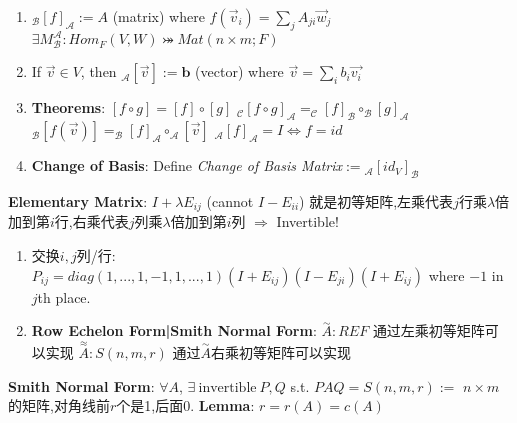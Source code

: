 \documentclass[9pt]{article}
\begin{document}
\begin{enumerate}[itemsep=-2pt, topsep=-2pt]
    \item $_{\mathcal{B}}[f]_{\mathcal{A}}:=A$ {\small (matrix)} where $f(\vec{v}_{i})=\sum_{j}A_{ji}\vec{w}_j$ \quad \quad $\exists M^{\mathcal{A}}_{\mathcal{B}}:Hom_{F}(V,W)\bij Mat(n\times m;F)$
    \item If $\vec{v}\in V$, then $_{\mathcal{A}}[\vec{v}]:=\mathbf{b}$ {\small (vector)} where $\vec{v}=\sum_{i}b_i\vec{v_i}$
    \item \textbf{Theorems}: $[f\circ g]=[f]\circ[g]$ \quad \quad $_{\mathcal{C}}[f\circ g]_{\mathcal{A}}=_{\mathcal{C}}[f]_{\mathcal{B}}\circ_{\mathcal{B}}[g]_{\mathcal{A}}$ \quad \quad $_{\mathcal{B}}[f(\vec{v})]=_{\mathcal{B}}[f]_{\mathcal{A}}\circ_{\mathcal{A}}[\vec{v}]$ \quad \quad $_{\mathcal{A}}[f]_{\mathcal{A}}=I\Leftrightarrow f=id$
    \item \textbf{Change of Basis}: {\small Define \textit{Change of Basis Matrix}$:=$$_{\mathcal{A}}[id_V]_{\mathcal{B}}$ \quad {}}
\end{enumerate}

\textbf{Elementary Matrix}: $I+\lambda E_{ij}$ {\scriptsize (cannot $I-E_{ii}$)} {\footnotesize 就是初等矩阵,左乘代表$j$行乘$\lambda$倍加到第$i$行,右乘代表$j$列乘$\lambda$倍加到第$i$列} \quad $\Rightarrow$ \quad Invertible!

\begin{enumerate}[itemsep=-2pt, topsep=-2pt]
    \item {\footnotesize 交换$i,j$列/行}: $P_{ij}=diag(1,...,1,-1,1,...,1)(I+E_{ij})(I-E_{ji})(I+E_{ij})$ where $-1$ in $j$th place.
    \vspace{-2pt}
    \item \textbf{Row Echelon Form|Smith Normal Form}: $\stackrel{\sim}{A}:REF$ {\footnotesize 通过左乘初等矩阵可以实现} \quad \quad $\stackrel{\approx}{A}:S(n,m,r)$ {\footnotesize 通过$\stackrel{\sim}{A}$右乘初等矩阵可以实现}
\end{enumerate}

\textbf{Smith Normal Form}: {\small $\forall A$, $\exists \ \text{invertible} \ P,Q$ s.t. $PAQ=S(n,m,r):=$ {\footnotesize $n\times m$的矩阵,对角线前$r$个是1,后面0}. \quad \textbf{Lemma}: $r=r(A)=c(A)$}
\end{document}
